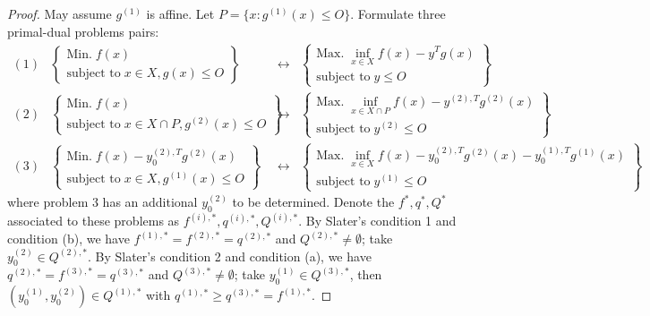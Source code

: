 \begin{proof}
	May assume $g^{(1)}$ is affine. Let $P=\{x:g^{(1)}(x)\leq O\}$. Formulate three primal-dual problems pairs:
	\[
		\begin{matrix}
			(1)                                    &
			\begin{Bmatrix}
				\text{Min.}\;    f(x) \\
				\text{subject to}\;  x\in X,g(x)\leq O
			\end{Bmatrix} & \leftrightarrow                                    &
			\begin{Bmatrix}
				\text{Max.}\;    \inf_{x\in X}f(x)-y^Tg(x) \\
				\text{subject to}\;    y\leq O
			\end{Bmatrix}
			\\
			(2)                                    & \begin{Bmatrix}
				                                         \text{Min.}\;    f(x) \\
				                                         \text{subject to}\;  x\in X\cap P,g^{(2)}(x)\leq O
			                                         \end{Bmatrix} & \leftrightarrow &
			\begin{Bmatrix}
				\text{Max.}\;    \inf_{x\in X\cap P}f(x)-y^{(2),T}g^{(2)}(x) \\
				\text{subject to}\;    y^{(2)}\leq O
			\end{Bmatrix}                               \\
			(3)                                    & \begin{Bmatrix}
				                                         \text{Min.}\;    f(x)-y^{(2),T}_0g^{(2)}(x) \\
				                                         \text{subject to}\;  x\in X,g^{(1)}(x)\leq O
			                                         \end{Bmatrix}     & \leftrightarrow &
			\begin{Bmatrix}
				\text{Max.}\;    \inf_{x\in X}f(x)-y^{(2),T}_0g^{(2)}(x)-y^{(1),T}_0g^{(1)}(x) \\
				\text{subject to}\;    y^{(1)}\leq O
			\end{Bmatrix}
		\end{matrix}
	\]
	where problem 3 has an additional $y^{(2)}_0$ to be determined. Denote the $f^\ast,q^\ast,Q^\ast$ associated to these problems as $f^{(i),\ast},q^{(i),\ast},Q^{(i),\ast}$. By Slater's condition 1 and condition (b), we have $f^{(1),\ast}=f^{(2),\ast}=q^{(2),\ast}$ and $Q^{(2),\ast}\neq\emptyset$; take $y^{(2)}_0\in Q^{(2),\ast}$. By Slater's condition 2 and condition (a), we have $q^{(2),\ast}=f^{(3),\ast}=q^{(3),\ast}$ and $Q^{(3),\ast}\neq\emptyset$; take $y^{(1)}_0\in Q^{(3),\ast}$, then $(y^{(1)}_0,y^{(2)}_0)\in Q^{(1),\ast}$ with $q^{(1),\ast}\geq q^{(3),\ast}=f^{(1),\ast}$.
\end{proof}

